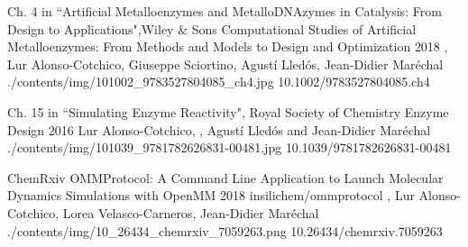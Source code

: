 \begin{cventries}

  \pubentry
    {Ch. 4 in ``Artificial Metalloenzymes and MetalloDNAzymes in Catalysis: From Design to Applications",\newline Wiley \& Sons} %
    {Computational Studies of Artificial Metalloenzymes: From Methods and Models to Design and Optimization} %
    {2018} %
    {} %
    {, Lur Alonso-Cotchico, Giuseppe Sciortino, Agustí Lledós, Jean-Didier Maréchal} %
    {./contents/img/101002_9783527804085_ch4.jpg} %
    {10.1002/9783527804085.ch4} %

    \pubentry
    {Ch. 15 in ``Simulating Enzyme Reactivity", Royal Society of Chemistry} %
    {Enzyme Design} %
    {2016} %
    {} %
    {Lur Alonso-Cotchico, , Agustí Lledós and Jean-Didier Maréchal} %
    {./contents/img/101039_9781782626831-00481.jpg} %
    {10.1039/9781782626831-00481} %

\end{cventries}

\begin{cventries}

  \pubentry
    {ChemRxiv} %
    {OMMProtocol: A Command Line Application to Launch Molecular Dynamics Simulations with OpenMM} %
    {2018} %
    {insilichem/ommprotocol} %
    {,\textsuperscript{\dagger} Lur Alonso-Cotchico, Lorea Velasco-Carneros, Jean-Didier Maréchal\textsuperscript{\dagger}} %
    {./contents/img/10_26434_chemrxiv_7059263.png} %
    {10.26434/chemrxiv.7059263} %

\end{cventries}
